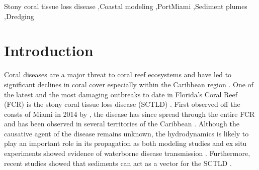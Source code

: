 \documentclass[preprint,12pt,authoryear]{elsarticle}
\begin{document}
\begin{frontmatter}
    \begin{keyword}
        Stony coral tissue loss disease \sep Coastal modeling \sep PortMiami \sep Sediment plumes \sep Dredging



    \end{keyword}

\end{frontmatter}

\linenumbers

\section{Introduction}

Coral diseases are a major threat to coral reef ecosystems and have led to significant declines in coral cover especially within the Caribbean region \citep{richardson1998coral, sutherland2004disease, aronson2001white, harvell2007coral, brandt2009dynamics}. One of the latest and the most damaging outbreaks to date in Florida's Coral Reef (FCR) is the stony coral tissue loss disease (SCTLD) \citep{noaa2018}. First observed off the coasts of Miami in 2014 by \cite{precht2016unprecedented}, the disease has since spread through the entire FCR \citep{muller2020spatial,dobbelaere2022connecting} and has been observed in several territories of the Caribbean \citep{kramer2019map, meiling2021variable, estrada2021effects,heres2021ecological}. Although the causative agent of the disease remains unknown, the hydrodynamics is likely to play an important role in its propagation as both modeling studies and ex situ experiments showed evidence of waterborne disease transmission \citep{aeby2019pathogenesis,dobbelaere2020coupled,eaton2021measuring, meiling2021variable}. Furthermore, recent studies showed that sediments can act as  a vector for the SCTLD \citep{rosales2020rhodobacterales, studivan2022reef}.
\end{document}
